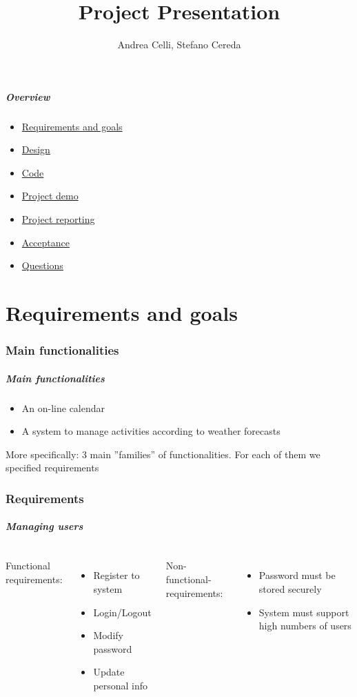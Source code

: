 \documentclass[professionalfonts]{beamer}
\title{Project Presentation}
\author{Andrea Celli, Stefano Cereda}
\institute[PoliMi]{Politecnico di Milano}
\begin{document}
\begin{frame}
\maketitle
\end{frame}

\begin{frame}
\frametitle{Overview}
\begin{itemize}
\item \hyperref[part:RASD]{Requirements and goals}
\item \hyperref[part:Design]{Design}
\item \hyperref[part:Code]{Code}
\item \hyperref[part:demo]{Project demo}
\item \hyperref[part:Reporting]{Project reporting}
\item \hyperref[part:Acceptance]{Acceptance}
\item \hyperref[part:questions]{Questions}
\end{itemize}
\end{frame}

\part{Requirements and goals}
\label{part:RASD}
\section{Main functionalities}
\begin{frame}
\frametitle{Main functionalities}
\begin{itemize}
\item An on-line calendar
\item A system to manage activities according to weather forecasts
\end{itemize}
More specifically: \alert{3 main ''families'' of functionalities}. For each of them we specified requirements
\end{frame}

\section{Requirements}
\begin{frame}
\frametitle{Managing users}
\begin{columns}[c]
Functional requirements:
\begin{itemize}
\item Register to system
\item Login/Logout
\item Modify password
\item Update personal info
\end{itemize}
Non-functional-requirements:
\begin{itemize}
\item Password must be stored securely
\item System must support high numbers of users
\end{itemize}
\end{columns}
\end{frame}
\end{document}
